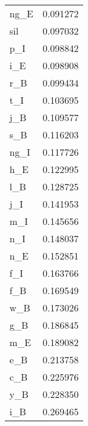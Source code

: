 \begin{tabular}{lr}
ng\_E &  0.091272 \\
sil  &  0.097032 \\
p\_I  &  0.098842 \\
i\_E  &  0.098908 \\
r\_B  &  0.099434 \\
t\_I  &  0.103695 \\
j\_B  &  0.109577 \\
s\_B  &  0.116203 \\
ng\_I &  0.117726 \\
h\_E  &  0.122995 \\
l\_B  &  0.128725 \\
j\_I  &  0.141953 \\
m\_I  &  0.145656 \\
n\_I  &  0.148037 \\
n\_E  &  0.152851 \\
f\_I  &  0.163766 \\
f\_B  &  0.169549 \\
w\_B  &  0.173026 \\
g\_B  &  0.186845 \\
m\_E  &  0.189082 \\
e\_B  &  0.213758 \\
c\_B  &  0.225976 \\
y\_B  &  0.228350 \\
i\_B  &  0.269465 \\
\bottomrule
\end{tabular}
